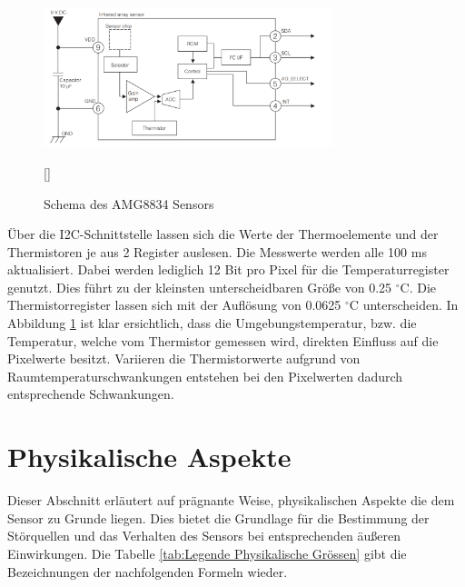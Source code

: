 \begin{figure}[H]
	\centering
	\includegraphics[width=0.75\textwidth]
	{fig/Circuit_AMG8834.PNG}
	\caption[Schema des AMG8834 Sensors]{Schema des AMG8834 Sensors} [\protect\cite{AMG8834}]
	\label{fig:SchemaAMG8834}
\end{figure}
 
Über die \ac{I2C}-Schnittstelle lassen sich die Werte der Thermoelemente und der Thermistoren je aus 2 Register auslesen. Die Messwerte werden alle 100 ms aktualisiert. Dabei werden lediglich 12 Bit pro Pixel für die Temperaturregister genutzt. Dies führt zu der kleinsten unterscheidbaren Größe von 0.25 $^\circ$C. Die Thermistorregister lassen sich mit der Auflösung von 0.0625 $^\circ$C unterscheiden. In Abbildung \ref{fig:SchemaAMG8834} ist klar ersichtlich, dass die Umgebungstemperatur, bzw. die Temperatur, welche vom Thermistor gemessen wird, direkten Einfluss auf die Pixelwerte besitzt. Variieren die Thermistorwerte aufgrund von Raumtemperaturschwankungen entstehen bei den Pixelwerten dadurch entsprechende Schwankungen.

\section{Physikalische Aspekte}
\label{sec:Physik}
Dieser Abschnitt erläutert auf prägnante Weise, physikalischen Aspekte die dem Sensor zu Grunde liegen. Dies bietet die Grundlage für die Bestimmung der Störquellen und das Verhalten des Sensors bei entsprechenden äußeren Einwirkungen. Die Tabelle \ref{tab:Legende Physikalische Grössen} gibt die Bezeichnungen der nachfolgenden Formeln wieder.

